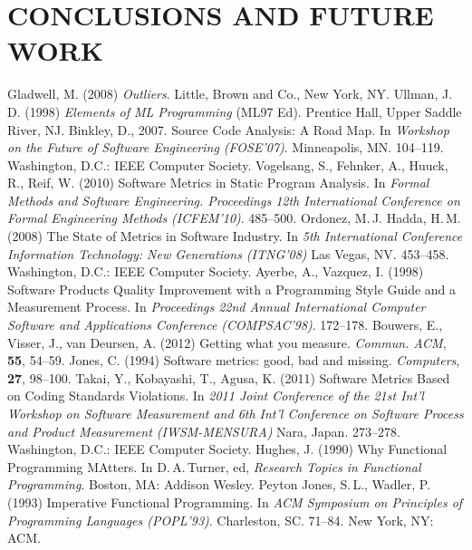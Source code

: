 \documentclass[12pt,abstracton]{scrartcl}
\begin{document}
\section{CONCLUSIONS AND FUTURE WORK}\label{sec:future}
\begin{thebibliography}{99}
 Gladwell, M. (2008) \emph{Outliers}. Little, Brown and Co., New York, NY.
 Ullman, J.\,D. (1998) \emph{Elements of ML Programming} (ML97 Ed). Prentice Hall, Upper Saddle River, NJ.
 Binkley, D., 2007. Source Code Analysis: A Road Map. In \emph{Workshop on the Future of Software Engineering (FOSE'07)}. Minneapolis, MN. 104--119. Washington, D.C.: IEEE Computer Society.
 Vogelsang, S., Fehnker, A., Huuck, R., Reif, W. (2010) Software Metrics in Static Program Analysis. In \emph{Formal Methods and Software Engineering. Proceedings 12th International Conference on Formal Engineering Methods (ICFEM'10)}. 485--500.
 Ordonez, M.\,J. Hadda, H.\,M. (2008) The State of Metrics in Software Industry. In \emph{5th International Conference Information Technology: New Generations (ITNG'08)} Las Vegas, NV. 453--458. Washington, D.C.: IEEE Computer Society.
 Ayerbe, A., Vazquez, I. (1998) Software Products Quality Improvement with a Programming Style Guide and a Measurement Process. In \emph{Proceedings 22nd Annual International Computer Software and Applications Conference (COMPSAC'98)}. 172--178.
 Bouwers, E., Visser, J., van Deursen, A. (2012) Getting what you measure. \emph{Commun. ACM}, \textbf{55}, 54--59.
 Jones, C. (1994) Software metrics: good, bad and missing. \emph{Computers}, \textbf{27}, 98--100.
 Takai, Y., Kobayashi, T., Agusa, K. (2011) Software Metrics Based on Coding Standards Violations. In \emph{2011 Joint Conference of the 21st Int'l Workshop on Software Measurement and 6th Int'l Conference on Software Process and Product Measurement (IWSM-MENSURA)} Nara, Japan. 273--278. Washington, D.C.: IEEE Computer Society.
 Hughes, J. (1990) Why Functional Programming MAtters. In D.\,A.\,Turner, ed, \emph{Research Topics in Functional Programming}. Boston, MA: Addison Wesley.
 Peyton Jones, S.\,L., Wadler, P. (1993) Imperative Functional Programming. In \emph{ACM Symposium on Principles of Programming Languages (POPL'93)}. Charleston, SC. 71--84. New York, NY: ACM.
\end{thebibliography}
\end{document}
